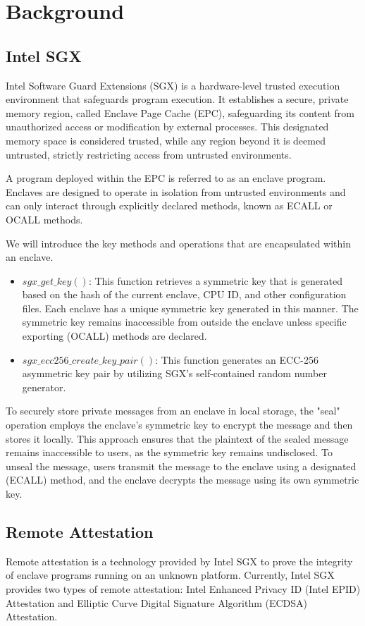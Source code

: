 \section{Background}
\subsection{Intel SGX}
Intel Software Guard Extensions (SGX) is a hardware-level trusted execution environment that safeguards program execution. It establishes a secure, private memory region, called Enclave Page Cache (EPC), safeguarding its content from unauthorized access or modification by external processes. This designated memory space is considered trusted, while any region beyond it is deemed untrusted, strictly restricting access from untrusted environments.

A program deployed within the EPC is referred to as an enclave program. Enclaves are designed to operate in isolation from untrusted environments and can only interact through explicitly declared methods, known as ECALL or OCALL methods.

We will introduce the key methods and operations that are encapsulated within an enclave.
\begin{itemize}
\item $sgx\_get\_key()$: This function retrieves a symmetric key that is generated based on the hash of the current enclave, CPU ID, and other configuration files. Each enclave has a unique symmetric key generated in this manner. The symmetric key remains inaccessible from outside the enclave unless specific exporting (OCALL) methods are declared.
\item $sgx\_ecc256\_create\_key\_pair()$: This function generates an ECC-256 asymmetric key pair by utilizing SGX's self-contained random number generator.
\end{itemize}

To securely store private messages from an enclave in local storage, the "seal" operation employs the enclave's symmetric key to encrypt the message and then stores it locally. This approach ensures that the plaintext of the sealed message remains inaccessible to users, as the symmetric key remains undisclosed.
To unseal the message, users transmit the message to the enclave using a designated (ECALL) method, and the enclave decrypts the message using its own symmetric key.

\subsection{Remote Attestation}
Remote attestation is a technology provided by Intel SGX to prove the integrity of enclave programs running on an unknown platform. Currently, Intel SGX provides two types of remote attestation: Intel Enhanced Privacy ID (Intel EPID) Attestation and Elliptic Curve Digital Signature Algorithm (ECDSA) Attestation.

